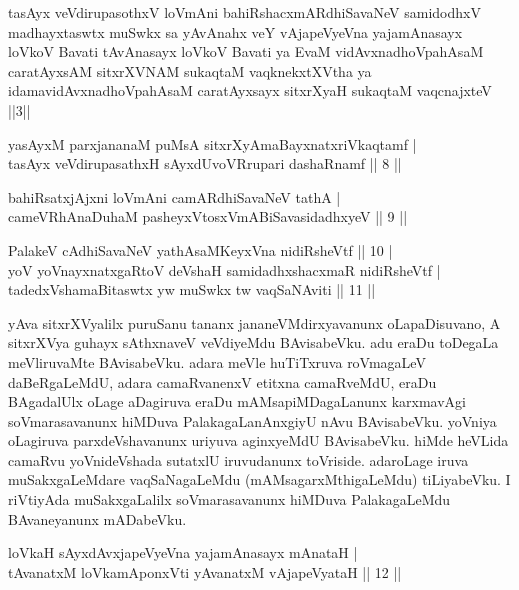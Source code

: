 
\begin{shl}
tasAyx veVdirupasothxV loVmAni bahiRshacxmARdhiSavaNeV samidodhxV madhayxtaswtx muSwkx sa yAvAnahx veY vAjapeVyeVna yajamAnasayx loVkoV Bavati tAvAnasayx loVkoV Bavati ya EvaM vidAvxnadhoVpahAsaM caratAyxsAM sitxrXVNAM sukaqtaM vaqknekxtXV\s tha ya idamavidAvxnadhoVpahAsaM caratAyxsayx sitxrXyaH sukaqtaM vaqcnajxteV ||3||
\end{shl}

\begin{shl}
yasAyxM  parxjananaM puMsA sitxrXyAmaBayxnatxriVkaqtamf | \\
tasAyx veVdirupasathxH sAyxdUvoVRrupari dashaRnamf \hfill|| 8 || 
\end{shl}

\begin{shl}
bahiRsatxjAjxni loVmAni camARdhiSavaNeV tathA | \\
cameVRhA\s \s naDuhaM pasheyxVtosxVmABiSavasidadhxyeV \hfill|| 9 || 
\end{shl}

\begin{shl}
PalakeV cAdhiSavaNeV yathAsaMKeyxVna nidiRsheVtf \hfill|| 10 | \\
yoV yoVnayxnatxgaRtoV deVshaH samidadhxshacxmaR nidiRsheVtf | \\
tadedxVshamaBitaswtx yw muSwkx tw vaqSaNAviti \hfill|| 11 || 
\end{shl}

\begin{artha}
yAva sitxrXVyalilx puruSanu tananx jananeVMdirxyavanunx oLapaDisuvano, 
A sitxrXVya guhayx sAthxnaveV veVdiyeMdu BAvisabeVku. adu eraDu toDegaLa 
meVliruvaMte BAvisabeVku. adara meVle huTiTxruva roVmagaLeV 
daBeRgaLeMdU, adara camaRvanenxV etitxna camaRveMdU, eraDu BAgadalUlx 
oLage aDagiruva eraDu mAMsapiMDagaLanunx karxmavAgi soVmarasavanunx 
hiMDuva PalakagaLanAnxgiyU nAvu BAvisabeVku. yoVniya oLagiruva 
parxdeVshavanunx uriyuva aginxyeMdU BAvisabeVku. hiMde heVLida camaRvu 
yoVnideVshada sutatxlU iruvudanunx toVriside. adaroLage iruva 
muSakxgaLeMdare vaqSaNagaLeMdu (mAMsagarxMthigaLeMdu) tiLiyabeVku. I 
riVtiyAda muSakxgaLalilx soVmarasavanunx hiMDuva PalakagaLeMdu 
BAvaneyanunx mADabeVku.
\end{artha}


\begin{shl}
loVkaH sAyxdAvxjapeVyeVna yajamAnasayx mAnataH | \\
tAvanatxM loVkamAponxVti yAvanatxM vAjapeVyataH \hfill|| 12 || 
\end{shl}

